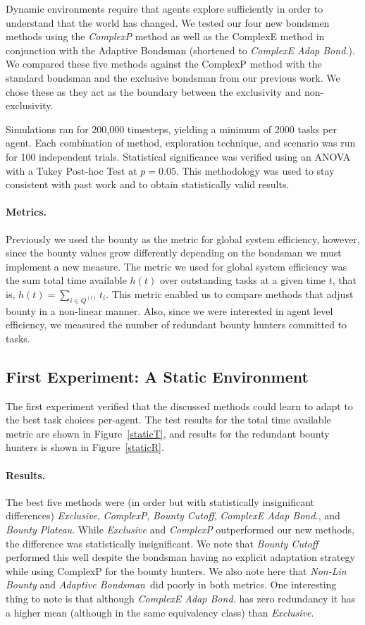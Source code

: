 \documentclass[letterpaper]{aamas2015}
\newcommand\paragrapha[1]{\paragraph*{{#1}.}}
\newcommand\bump{\vspace{10in}}
\begin{document}
Dynamic environments require that agents explore sufficiently in order to understand that the world has changed.  We tested our four new bondsmen methods using the \textit{ComplexP} method as well as the ComplexE method in conjunction with the Adaptive Bondsman (shortened to \textit{ComplexE Adap Bond.}).  We compared these five methods against the ComplexP method with the standard bondsman and the exclusive bondsman from our previous work.  We chose these as they act as the boundary between the exclusivity and non-exclusivity.  

Simulations ran for 200,000 timesteps, yielding a minimum of 2000 tasks per agent. Each combination of method, exploration technique, and scenario was run for 100 independent trials.  Statistical significance was verified using an ANOVA with a Tukey Post-hoc Test at \(p=0.05\).  This methodology was used to stay consistent with past work and to obtain statistically valid results.  

\paragrapha{Metrics}
Previously we used the bounty as the metric for global system efficiency, however, since the bounty values grow differently depending on the bondsman we must implement a new measure.  The metric we used for global system efficiency was the sum total time available \(h(t)\) over outstanding tasks at a given time \(t\), that is, \(h(t) =\sum_{i\in Q^{(t)}}t_i\).  This metric enabled us to compare methods that adjust bounty in a non-linear manner.  Also, since we were interested in agent level efficiency, we measured the number of redundant bounty hunters committed to tasks.


\subsection{First Experiment: A Static Environment}

The first experiment verified that the discussed methods could learn to adapt to the best task choices per-agent.  
The test results for the total time available metric are shown in Figure~\ref{staticT}, and results for the redundant bounty hunters is shown in Figure~\ref{staticR}.



\paragrapha{Results}


The best five methods were (in order but with statistically insignificant differences) {\it Exclusive}, {\it ComplexP}, {\it Bounty Cutoff},  {\it ComplexE Adap Bond.}, and {\it Bounty Plateau}.  While \textit{Exclusive} and \textit{ComplexP} outperformed our new methods, the difference was statistically insignificant.  We note that {\it Bounty Cutoff} performed this well despite the bondsman having no explicit adaptation strategy while using ComplexP for the bounty hunters.  We also note here that {\it Non-Lin Bounty} and {\it Adaptive Bondsman}\, did poorly in both metrics.  One interesting thing to note is that although {\it ComplexE Adap Bond.} has zero redundancy it has a higher mean (although in the same equivalency class) than {\it Exclusive}.
\end{document}
